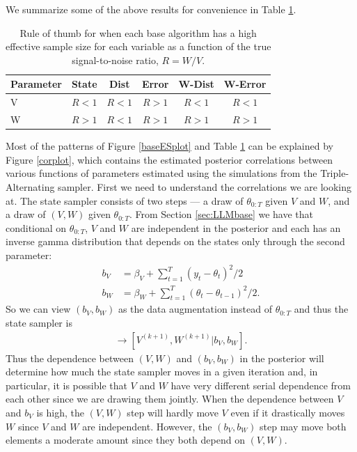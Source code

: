 \documentclass{article}
\begin{document}
We summarize some of the above results for convenience in Table \ref{tab:stnmix}.
\begin{table}
  \centering
  \begin{tabular}{|l|ccccc|}\hline
    Parameter & State & Dist & Error & W-Dist & W-Error \\\hline
    V & $R < 1$ & $R < 1$ & $R > 1$ & $R < 1$ & $R < 1$\\
    W & $R > 1$ & $R < 1$ & $R > 1$ & $R > 1$ & $R > 1$ \\\hline
  \end{tabular}
  \caption{Rule of thumb for when each base algorithm has a high effective sample size for each variable as a function of the true signal-to-noise ratio, $R=W/V$.}
  \label{tab:stnmix}
\end{table}
Most of the patterns of Figure \ref{baseESplot} and Table \ref{tab:stnmix} can be explained by Figure \ref{corplot}, which contains the estimated posterior correlations between various functions of parameters estimated using the simulations from the Triple-Alternating sampler. First we need to understand the correlations we are looking at. The state sampler consists of two steps --- a draw of $\theta_{0:T}$ given $V$ and $W$, and a draw of $(V,W)$ given $\theta_{0:T}$. From Section \ref{sec:LLMbase} we have that conditional on $\theta_{0:T}$, $V$ and $W$ are independent in the posterior and each has an inverse gamma distribution that depends on the states only through the second parameter:
\begin{align*}
  b_V &= \beta_V + \sum_{t=1}^T(y_t - \theta_t)^2/2\\
  b_W &= \beta_W + \sum_{t=1}^T(\theta_t - \theta_{t-1})^2/2.
\end{align*}
So we can view $(b_V,b_W)$ as the data augmentation instead of $\theta_{0:T}$ and thus the state sampler is
\begin{align*}
  [b_V, b_W|V^{(k)},W^{(k)}] \to [V^{(k+1)},W^{(k+1)}|b_V,b_W].
\end{align*}
Thus the dependence between $(V,W)$ and $(b_V,b_W)$ in the posterior will determine how much the state sampler moves in a given iteration and, in particular, it is possible that $V$ and $W$ have very different serial dependence from each other since we are drawing them jointly. When the dependence between $V$ and $b_V$ is high, the $(V,W)$ step will hardly move $V$ even if it drastically moves $W$ since $V$ and $W$ are independent. However, the $(b_V,b_W)$ step may move both elements a moderate amount since they both depend on $(V,W)$.
\end{document}
